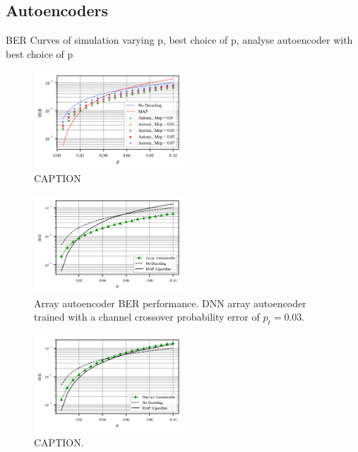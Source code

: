 \documentclass[conference]{IEEEtran}
\begin{document}
\subsection{Autoencoders}
BER Curves of simulation varying p, best choice of p, analyse autoencoder with best choice of p


\begin{figure}[!ht]
  \centering
    \includegraphics[width=0.5\textwidth]{images/MAP_AutoencoderArray_Mep_65536_64_128_256_p_analysis}
    \caption{CAPTION}\label{fig:parrayanalysis}
\end{figure}


\begin{figure}[!ht]
  \centering
    \includegraphics[width=0.5\textwidth]{images/AutoencoderArray_Mep_65536_ptrain_003_logcosh}
    \caption{Array autoencoder BER performance. DNN array autoencoder trained with a channel crossover probability error of $p_t=0.03$.}\label{fig:arrayautoencoder}
\end{figure}


\begin{figure}[!ht]
  \centering
    \includegraphics[width=0.5\textwidth]{images/MAP_Autoencoder1H_Mep_131072_ptrain_0_192_128_96_64_32-128}
    \caption{CAPTION.}\label{fig:1hautoencoder}
\end{figure}
\end{document}
